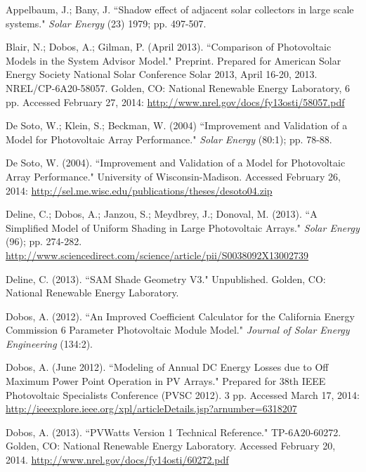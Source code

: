 \documentclass[12pt,letterpaper]{article}
\begin{document}
%
\begin{thebibliography}{99}

 Appelbaum, J.; Bany, J. ``Shadow effect of adjacent solar collectors in large scale systems." \textit{Solar Energy} (23) 1979; pp. 497-507.

 Blair, N.; Dobos, A.; Gilman, P. (April 2013). ``Comparison of Photovoltaic Models in the System Advisor Model." Preprint. Prepared for American Solar Energy Society National Solar Conference Solar 2013, April 16-20, 2013. NREL/CP-6A20-58057. Golden, CO: National Renewable Energy Laboratory, 6 pp. Accessed February 27, 2014: \url{http://www.nrel.gov/docs/fy13osti/58057.pdf}

 De Soto, W.; Klein, S.; Beckman, W. (2004) ``Improvement and Validation of a Model for Photovoltaic Array Performance." \textit{Solar Energy} (80:1); pp. 78-88.

 De Soto, W. (2004). ``Improvement and Validation of a Model for Photovoltaic Array Performance." University of Wisconsin-Madison. Accessed February 26, 2014: \url{http://sel.me.wisc.edu/publications/theses/desoto04.zip}

 Deline, C.; Dobos, A.; Janzou, S.; Meydbrey, J.; Donoval, M. (2013). ``A Simplified Model of Uniform Shading in Large Photovoltaic Arrays." \textit{Solar Energy} (96); pp. 274-282. \url{http://www.sciencedirect.com/science/article/pii/S0038092X13002739}

 Deline, C. (2013). ``SAM Shade Geometry V3." Unpublished. Golden, CO: National Renewable Energy Laboratory.

 Dobos, A. (2012). ``An Improved Coefficient Calculator for the California Energy Commission 6 Parameter Photovoltaic Module Model." \textit{Journal of Solar Energy Engineering} (134:2).

 Dobos, A. (June 2012). ``Modeling of Annual DC Energy Losses due to Off Maximum Power Point Operation in PV Arrays." Prepared for 38th IEEE Photovoltaic Specialists Conference (PVSC 2012). 3 pp. Accessed March 17, 2014: \url{http://ieeexplore.ieee.org/xpl/articleDetails.jsp?arnumber=6318207}

 Dobos, A. (2013). ``PVWatts Version 1 Technical Reference." TP-6A20-60272. Golden, CO: National Renewable Energy Laboratory. Accessed February 20, 2014. \url{http://www.nrel.gov/docs/fy14osti/60272.pdf}


\end{thebibliography}
\end{document}
